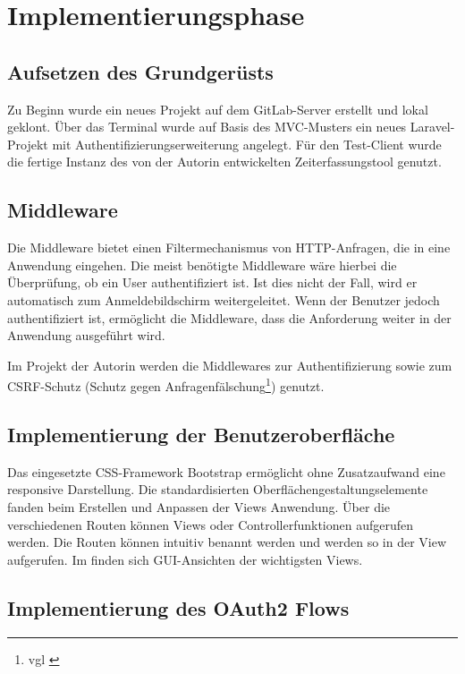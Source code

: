 \section{Implementierungsphase} 
\label{sec:Implementierungsphase}

\subsection{Aufsetzen des Grundgerüsts}
\label{sec:AufsetzenGrundgeruest}

Zu Beginn wurde ein neues Projekt auf dem GitLab-Server erstellt und lokal geklont. Über das Terminal wurde auf Basis des MVC-Musters ein neues Laravel-Projekt mit Authentifizierungserweiterung angelegt. 
Für den Test-Client wurde die fertige Instanz des von der Autorin entwickelten Zeiterfassungstool genutzt.

\subsection{Middleware}
\label{sec:Middleware}
Die Middleware bietet einen Filtermechanismus von HTTP-Anfragen, die in eine Anwendung eingehen. Die meist benötigte Middleware wäre hierbei die Überprüfung, ob ein User authentifiziert ist. Ist dies nicht der Fall, wird er automatisch zum Anmeldebildschirm weitergeleitet. Wenn der Benutzer jedoch authentifiziert ist, ermöglicht die Middleware, dass die Anforderung weiter in der Anwendung ausgeführt wird.

Im Projekt der Autorin werden die Middlewares zur Authentifizierung sowie zum \acs{CSRF}-Schutz (Schutz gegen Anfragenfälschung\footnote{vgl \cite{CSRF}}) genutzt.

\subsection{Implementierung der Benutzeroberfläche}
\label{sec:ImplBenutzeroberflaeche}

Das eingesetzte CSS-Framework Bootstrap ermöglicht ohne Zusatzaufwand eine responsive Darstellung. Die standardisierten Oberflächengestaltungselemente fanden beim Erstellen und Anpassen der Views Anwendung. 
Über die verschiedenen Routen können Views oder Controllerfunktionen aufgerufen werden. Die Routen können intuitiv benannt werden und werden so in der View aufgerufen.
Im  finden sich GUI-Ansichten der wichtigsten Views.

\subsection{Implementierung des OAuth2 Flows}
\label{sec:ImplementierungOAuth2}

